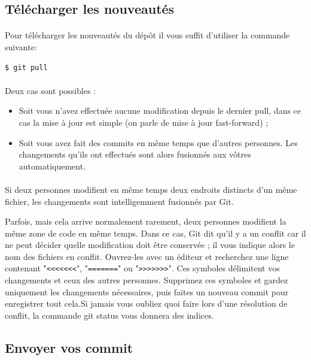 \documentclass[french, a4paper, 12pt, titlepage]{article}
\begin{document}
\subsection{Télécharger les nouveautés}
\paragraph{}Pour télécharger les nouveautés du dépôt il vous suffit d'utiliser la commande suivante:
\begin{lstlisting}
$ git pull
\end{lstlisting}
\paragraph{}Deux cas sont possibles :
\begin{itemize}
\item Soit vous n’avez effectuée aucune modification depuis le dernier pull, dans ce cas la mise à jour est simple (on parle de mise à jour fast-forward) ;
\item Soit vous avez fait des commits en même temps que d’autres personnes. Les changements qu’ils ont effectués sont alors fusionnés aux vôtres automatiquement.
\end{itemize}

\paragraph{}Si deux personnes modifient en même temps deux endroits distincts d’un même fichier, les changements sont intelligemment fusionnés par Git.

Parfois, mais cela arrive normalement rarement, deux personnes modifient la
même zone de code en même temps. Dans ce cas, Git dit qu’il y a un conflit car
il ne peut décider quelle modification doit être conservée ; il vous indique
alors le nom des fichiers en conflit. Ouvrez-les avec un éditeur et recherchez
une ligne contenant "\verb+<<<<<<<+", "\verb+=======+" ou "\verb+>>>>>>>+". Ces
symboles délimitent vos changements et ceux des autres personnes. Supprimez ces
symboles et gardez uniquement les changements nécessaires, puis faites un
nouveau commit pour enregistrer tout cela.Si jamais vous oubliez quoi faire
lors d'une résolution de conflit, la commande git status vous donnera des
indices.

\subsection{Envoyer vos commit}
\end{document}
